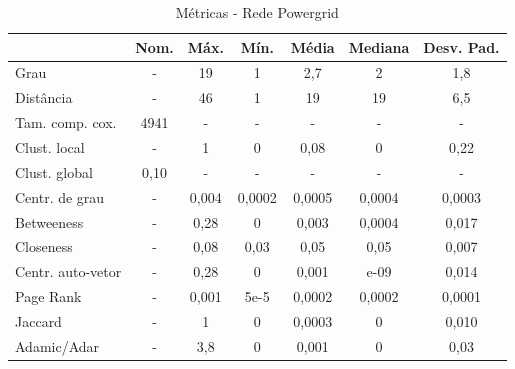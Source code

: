 \documentclass[12pt,a4paper]{article}
\begin{document}
	\begin{table}[H]
		\caption{Métricas - Rede Powergrid}
		\label{tab:powergrid}
		\centering
		\begin{tabular}{l|c|c|c|c|c|c}
			& \textbf{Nom.} & \textbf{Máx.} & \textbf{Mín.} & \textbf{Média} & \textbf{Mediana} & \textbf{Desv. Pad.} \\\hline
			Grau              & -                                 & 19            & 1             & 2,7            & 2                & 1,8                \\ \hline
			Distância         & -                                 & 46            & 1             & 19             & 19               & 6,5                \\ \hline
			Tam. comp. cox.   & 4941                              & -             & -             & -              & -                & -                  \\ \hline
			Clust. local      & -                                 & 1             & 0             & 0,08           & 0                & 0,22               \\ \hline
			Clust. global     & 0,10                              & -             & -             & -              & -                & -                  \\ \hline
			Centr. de grau    & -                                 & 0,004         & 0,0002        & 0,0005         & 0,0004           & 0,0003             \\ \hline
			Betweeness        & -                                 & 0,28          & 0             & 0,003          & 0,0004           & 0,017              \\ \hline
			Closeness         & -                                 & 0,08          & 0,03          & 0,05           & 0,05             & 0,007              \\ \hline
			Centr. auto-vetor & -                                 & 0,28          & 0          & 0,001          & e-09             & 0,014              \\\hline
			Page Rank         & -                                 & 0,001         & 5e-5          & 0,0002         & 0,0002           & 0,0001             \\\hline
			Jaccard           & -                                 & 1             & 0             & 0,0003         & 0                & 0,010              \\\hline
			Adamic/Adar       & -                                 & 3,8           & 0             & 0,001          & 0                & 0,03              
		\end{tabular}
	\end{table}
	
\end{document}
